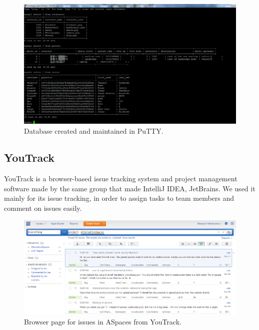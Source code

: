 \begin{figure}
  \centering
  \includegraphics[width=\linewidth]{./Planning/img/puttydb}
  \caption{Database created and maintained in PuTTY.}
  \label{fig:PlanningSoftwareDevPutty}
\end{figure}

\subsection{YouTrack}
\label{subsec:PlanningSoftwareDevYouTrack}
YouTrack is a browser-based issue tracking system and project management software made by the same group that made IntelliJ IDEA, JetBrains. We used it mainly for its issue tracking, in order to assign tasks to team members and comment on issues easily.

\begin{figure}[ht!]
  \centering
  \includegraphics[width=\linewidth]{./Planning/img/YouTrackPage}
  \caption{Browser page for issues in ASpaces from YouTrack.}
  \label{fig:PlanningSoftwareDevYouTrack}
\end{figure}
